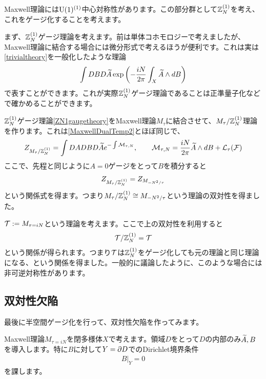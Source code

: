 \documentclass[generalized_symmetry.tex]{subfiles}
\begin{document}
Maxwell理論には$\mbox{U}(1)^{(1)}$中心対称性があります。この部分群として$\mathbb{Z}_N^{(1)}$を考え、これをゲージ化することを考えます。

まず、$\mathbb{Z}_N^{(1)}$ゲージ理論を考えます。前は単体コホモロジーで考えましたが、Maxwell理論に結合する場合には微分形式で考えるほうが便利です。これは実は\eqref{trivialtheory}を一般化したような理論
\begin{align}
  \int DB D\widetilde{A} \exp\left(-\frac{iN}{2\pi}\int_{X} \widetilde{A} \wedge dB\right)
    \label{ZN1gaugetheory}
\end{align}
で表すことができます。これが実際$\mathbb{Z}_N^{(1)}$ゲージ理論であることは正準量子化などで確かめることができます。

$\mathbb{Z}_N^{(1)}$ゲージ理論\eqref{ZN1gaugetheory}をMaxwell理論$M_{\tau}$に結合させて、$M_{\tau}/\mathbb{Z}_N^{(1)}$理論を作ります。これは\eqref{MaxwellDualTemp2}とほぼ同じで、
\begin{align}
  Z_{M_{\tau}/\mathbb{Z}_N^{(1)}}= \int DA DB D\widetilde{A} e^{-\int \mathcal{M}_{\tau,N}},\qquad \mathcal{M}_{\tau,N}=\frac{iN}{2\pi}\widetilde{A} \wedge dB+\mathcal{L}_{\tau}(\mathcal{F})\label{Maxwell/ZN}
\end{align}
ここで、先程と同じように$A=0$ゲージをとって$B$を積分すると
\begin{align}
  Z_{M_{\tau}/\mathbb{Z}_N^{(1)}}=Z_{M_{-N^2/\tau}}
\end{align}
という関係式を得ます。つまり$M_{\tau}/\mathbb{Z}_N^{(1)}\cong M_{-N^2/\tau}$という理論の双対性を得ました。

$\mathcal{T}:=M_{\tau=iN}$という理論を考えます。ここで上の双対性を利用すると
\begin{align}
  \mathcal{T}/\mathbb{Z}_N^{(1)} = \mathcal{T}
\end{align}
という関係が得られます。つまり$\mathcal{T}$は$\mathbb{Z}_N^{(1)}$をゲージ化しても元の理論と同じ理論になる、という関係を得ました。一般的に議論したように、このような場合には非可逆対称性があります。

\subsection{双対性欠陥}

最後に半空間ゲージ化を行って、双対性欠陥を作ってみます。

Maxwell理論$M_{\tau=iN}$を閉多様体$X$で考えます。領域$D$をとって$D$の内部のみ$\widetilde{A},B$を導入します。特に$B$に対して$Y=\partial D$でのDirichlet境界条件
\begin{align}
  B|_{Y}=0
\end{align}
を課します。
\end{document}
